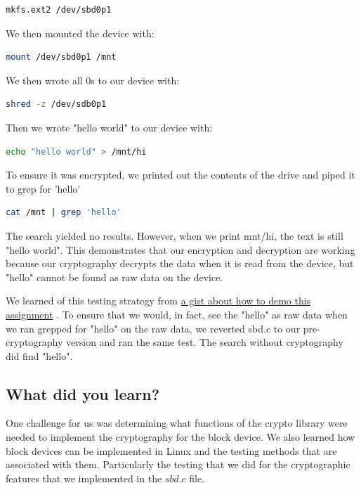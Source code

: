 \documentclass[letterpaper, onecolumn, draftclsnofoot, 10pt, compsoc]{IEEEtran}
\begin{document}
\begin{singlespace}
        \begin{lstlisting}[language=bash]
mkfs.ext2 /dev/sbd0p1
        \end{lstlisting}
        
        We then mounted the device with:
        
        \begin{lstlisting}[language=bash]
mount /dev/sbd0p1 /mnt
        \end{lstlisting}
        
        We then wrote all 0s to our device with:
        
        \begin{lstlisting}[language=bash]
shred -z /dev/sdb0p1
        \end{lstlisting}
        
        Then we wrote "hello world" to our device with:
        
        \begin{lstlisting}[language=bash]
echo "hello world" > /mnt/hi
        \end{lstlisting}
        
        To ensure it was encrypted, we printed out the contents of the drive and piped it to grep for 'hello'
        
        \begin{lstlisting}[language=bash]
cat /mnt | grep 'hello'
        \end{lstlisting}
        
        The search yielded no results. However, when we print mnt/hi, the text is still "hello world". This demonstrates that our encryption and decryption are working because our cryptography decrypts the data when it is read from the device, but "hello" cannot be found as raw data on the device.
        
        We learned of this testing strategy from \href{https://gist.github.com/iankronquist/c3f3ef5dcec8d812a359ce6a723c2f05}{a gist about how to demo this assignment} \cite{HW3Gist}. To ensure that we would, in fact, see the "hello" as raw data when we ran grepped for "hello" on the raw data, we reverted sbd.c to our pre-cryptography version and ran the same test. The search without cryptography did find "hello".
        \end{singlespace}
    
    \subsection{What did you learn?}
        \begin{singlespace}
            One challenge for us was determining what functions of the crypto library were needed to implement the cryptography for the block device. We also learned how block devices can be implemented in Linux and the testing methods that are associated with them. Particularly the testing that we did for the cryptographic features that we implemented in the $sbd.c$ file. 
        \end{singlespace}

{}

\end{document}
